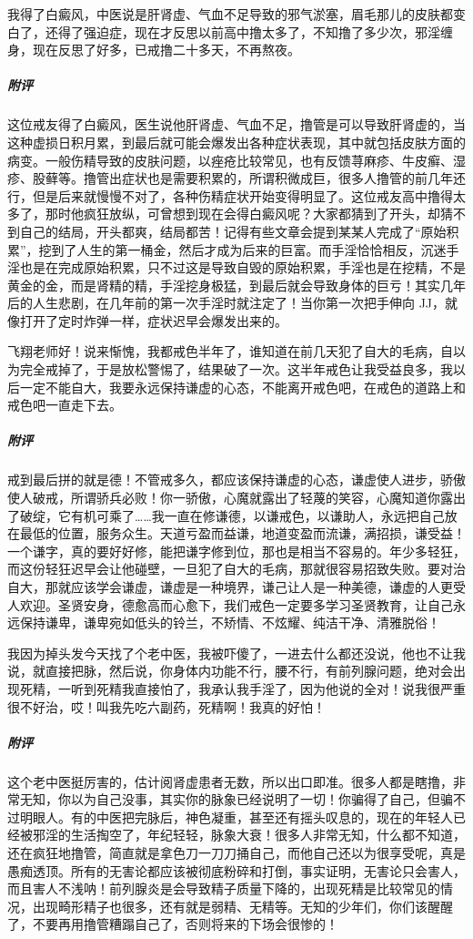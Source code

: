 \begin{case}
    我得了白癜风，中医说是肝肾虚、气血不足导致的邪气淤塞，眉毛那儿的皮肤都变白了，还得了强迫症，现在才反思以前高中撸太多了，不知撸了多少次，邪淫缠身，现在反思了好多，已戒撸二十多天，不再熬夜。
    \subparagraph{附评} 这位戒友得了白癜风，医生说他肝肾虚、气血不足，撸管是可以导致肝肾虚的，当这种虚损日积月累，到最后就可能会爆发出各种症状表现，其中就包括皮肤方面的病变。一般伤精导致的皮肤问题，以痤疮比较常见，也有反馈荨麻疹、牛皮癣、湿疹、股藓等。撸管出症状也是需要积累的，所谓积微成巨，很多人撸管的前几年还行，但是后来就慢慢不对了，各种伤精症状开始变得明显了。这位戒友高中撸得太多了，那时他疯狂放纵，可曾想到现在会得白癜风呢？大家都猜到了开头，却猜不到自己的结局，开头都爽，结局都苦！记得有些文章会提到某某人完成了“原始积累”，挖到了人生的第一桶金，然后才成为后来的巨富。而手淫恰恰相反，沉迷手淫也是在完成原始积累，只不过这是导致自毁的原始积累，手淫也是在挖精，不是黄金的金，而是肾精的精，手淫挖身极猛，到最后就会导致身体的巨亏！其实几年后的人生悲剧，在几年前的第一次手淫时就注定了！当你第一次把手伸向 JJ，就像打开了定时炸弹一样，症状迟早会爆发出来的。
\end{case}

\begin{case}
    飞翔老师好！说来惭愧，我都戒色半年了，谁知道在前几天犯了自大的毛病，自以为完全戒掉了，于是放松警惕了，结果破了一次。这半年戒色让我受益良多，我以后一定不能自大，我要永远保持谦虚的心态，不能离开戒色吧，在戒色的道路上和戒色吧一直走下去。
    \subparagraph{附评} 戒到最后拼的就是德！不管戒多久，都应该保持谦虚的心态，谦虚使人进步，骄傲使人破戒，所谓骄兵必败！你一骄傲，心魔就露出了轻蔑的笑容，心魔知道你露出了破绽，它有机可乘了……我一直在修谦德，以谦戒色，以谦助人，永远把自己放在最低的位置，服务众生。天道亏盈而益谦，地道变盈而流谦，满招损，谦受益！一个谦字，真的要好好修，能把谦字修到位，那也是相当不容易的。年少多轻狂，而这份轻狂迟早会让他碰壁，一旦犯了自大的毛病，那就很容易招致失败。要对治自大，那就应该学会谦虚，谦虚是一种境界，谦己让人是一种美德，谦虚的人更受人欢迎。圣贤安身，德愈高而心愈下，我们戒色一定要多学习圣贤教育，让自己永远保持谦卑，谦卑宛如低头的铃兰，不矫情、不炫耀、纯洁干净、清雅脱俗！
\end{case}

\begin{case}
    我因为掉头发今天找了个老中医，我被吓傻了，一进去什么都还没说，他也不让我说，就直接把脉，然后说，你身体内功能不行，腰不行，有前列腺问题，绝对会出现死精，一听到死精我直接怕了，我承认我手淫了，因为他说的全对！说我很严重很不好治，哎！叫我先吃六副药，死精啊！我真的好怕！
    \subparagraph{附评} 这个老中医挺厉害的，估计阅肾虚患者无数，所以出口即准。很多人都是瞎撸，非常无知，你以为自己没事，其实你的脉象已经说明了一切！你骗得了自己，但骗不过明眼人。有的中医把完脉后，神色凝重，甚至还有摇头叹息的，现在的年轻人已经被邪淫的生活掏空了，年纪轻轻，脉象大衰！很多人非常无知，什么都不知道，还在疯狂地撸管，简直就是拿色刀一刀刀捅自己，而他自己还以为很享受呢，真是愚痴透顶。所有的无害论都应该被彻底粉碎和打倒，事实证明，无害论只会害人，而且害人不浅呐！前列腺炎是会导致精子质量下降的，出现死精是比较常见的情况，出现畸形精子也很多，还有就是弱精、无精等。无知的少年们，你们该醒醒了，不要再用撸管糟蹋自己了，否则将来的下场会很惨的！
\end{case}

